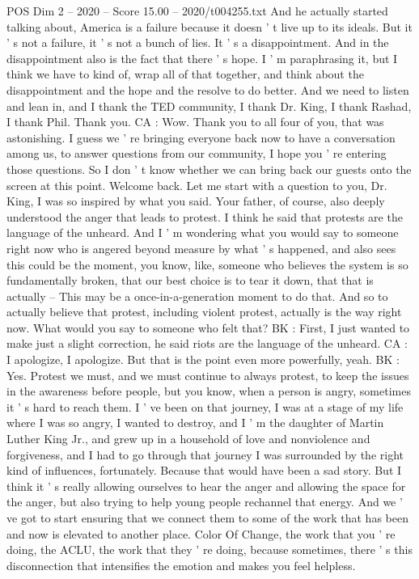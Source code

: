 \begin{textsample}{POS Dim 2 – 2020 – Score 15.00 – 2020/t004255.txt}
And he actually started talking about, America is a failure because it doesn ' t live up to its ideals.
But it ' s not a failure, it ' s not a bunch of lies.
It ' s a disappointment.
And in the disappointment also is the fact that there ' s hope.
I ' m paraphrasing it, but I think we have to kind of, wrap all of that together, and think about the disappointment and the hope and the resolve to do better.
And we need to listen and lean in, and I thank the TED community, I thank Dr.
King, I thank Rashad, I thank Phil.
Thank you.
CA : Wow.
Thank you to all four of you, that was astonishing.
I guess we ' re bringing everyone back now to have a conversation among us, to answer questions from our community, I hope you ' re entering those questions.
So I don ' t know whether we can bring back our guests onto the screen at this point.
Welcome back.
Let me start with a question to you, Dr.
King, I was so inspired by what you said.
Your father, of course, also deeply understood the anger that leads to protest.
I think he said that protests are the language of the unheard.
And I ' m wondering what you would say to someone right now who is angered beyond measure by what ' s happened, and also sees this could be the moment, you know, like, someone who believes the system is so fundamentally broken, that our best choice is to tear it down, that that is actually -- This may be a once-in-a-generation moment to do that.
And so to actually believe that protest, including violent protest, actually is the way right now.
What would you say to someone who felt that?
BK : First, I just wanted to make just a slight correction, he said riots are the language of the unheard.
CA : I apologize, I apologize.
But that is the point even more powerfully, yeah.
BK : Yes.
Protest we must, and we must continue to always protest, to keep the issues in the awareness before people, but you know, when a person is angry, sometimes it ' s hard to reach them.
I ' ve been on that journey, I was at a stage of my life where I was so angry, I wanted to destroy, and I ' m the daughter of Martin Luther King Jr., and grew up in a household of love and nonviolence and forgiveness, and I had to go through that journey I was surrounded by the right kind of influences, fortunately.
Because that would have been a sad story.
But I think it ' s really allowing ourselves to hear the anger and allowing the space for the anger, but also trying to help young people rechannel that energy.
And we ' ve got to start ensuring that we connect them to some of the work that has been and now is elevated to another place.
Color Of Change, the work that you ' re doing, the ACLU, the work that they ' re doing, because sometimes, there ' s this disconnection that intensifies the emotion and makes you feel helpless.

\end{textsample}
